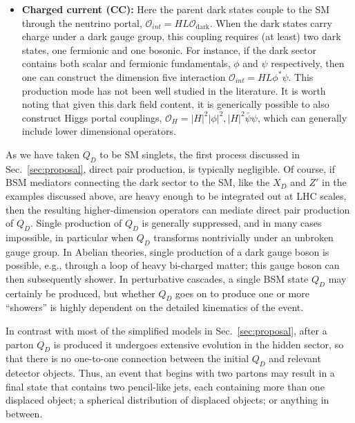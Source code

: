 \begin{itemize}
\item {\bf Charged current (CC):} Here the parent dark states couple to the SM through the neutrino portal, $\mathcal{O}_{int}=HL \mathcal{O}_{\mathrm{dark}}$. When the dark states carry charge under a dark gauge group, this coupling requires (at least) two dark states, one fermionic and one bosonic. For instance, if the dark sector contains both scalar and fermionic fundamentals, $\phi$ and $\psi$ respectively, then one can construct the dimension five interaction $\mathcal{O}_{int} = HL\phi^* \psi$. This production mode has not been well studied in the literature. It is worth noting that given this dark field content, it is generically possible to also construct Higgs portal couplings, $\mathcal{O}_H = |H| ^ 2 |\phi|^2, |H|^2\bar\psi\psi$, which can generally include lower dimensional operators.

\end{itemize}

As we have taken $Q_D$ to be SM singlets, the first process discussed in Sec.~\ref{sec:proposal}, direct pair production, is typically negligible. Of course, if BSM mediators connecting the dark sector to the SM, like the $X_D$ and $Z'$ in the examples discussed above, are heavy enough to be integrated out at LHC scales, then the resulting higher-dimension operators can mediate direct pair production of $Q_D$. Single production of $Q_D$ is generally suppressed, and in many cases impossible, in particular when $Q_D$ transforms nontrivially under an unbroken gauge group. In Abelian theories, single production of a dark gauge boson is possible, e.g., through a loop of heavy bi-charged matter; this gauge boson can then subsequently shower. In perturbative cascades, a single BSM state $Q_D$ may certainly be produced, but whether $Q_D$ goes on to produce one or more ``showers'' is highly dependent on the detailed kinematics of the event.

In contrast with most of the simplified models in Sec.~\ref{sec:proposal}, after a parton $Q_D$ is produced it undergoes extensive evolution in the hidden sector, so that there is no one-to-one connection between the initial $Q_D$ and relevant detector objects. Thus, an event that begins with two partons may result in a final state that contains two pencil-like jets, each containing more than one displaced object; a spherical distribution of displaced objects; or anything in between.


